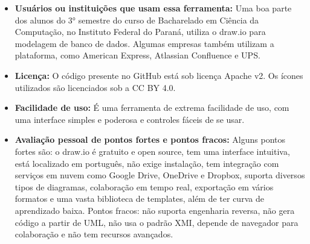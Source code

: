 \documentclass{article}
\begin{document}
\begin{itemize}[leftmargin=*, itemsep=0.4em]
  \item \textbf{Usuários ou instituições que usam essa ferramenta:} Uma boa parte dos alunos do 3° semestre do curso de Bacharelado em Ciência da Computação, no Instituto Federal do Paraná, utiliza o draw.io para modelagem de banco de dados. Algumas empresas também utilizam a plataforma, como American Express, Atlassian Confluence e UPS.

  \item \textbf{Licença:} O código presente no GitHub está sob licença Apache v2. Os ícones utilizados são licenciados sob a CC BY 4.0.

  \item \textbf{Facilidade de uso:} É uma ferramenta de extrema facilidade de uso, com uma interface simples e poderosa e controles fáceis de se usar.

  \item \textbf{Avaliação pessoal de pontos fortes e pontos fracos:}  
  Alguns pontos fortes são: o draw.io é gratuito e open source, tem uma interface intuitiva, está localizado em português, não exige instalação, tem integração com serviços em nuvem como Google Drive, OneDrive e Dropbox, suporta diversos tipos de diagramas, colaboração em tempo real, exportação em vários formatos e uma vasta biblioteca de templates, além de ter curva de aprendizado baixa.  
  Pontos fracos: não suporta engenharia reversa, não gera código a partir de UML, não usa o padrão XMI, depende de navegador para colaboração e não tem recursos avançados.
\end{itemize}
\end{document}
